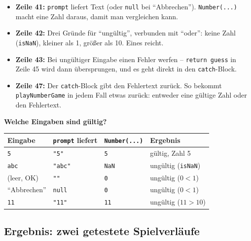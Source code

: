 \documentclass[a4paper,11pt]{article}
\begin{document}
\begin{itemize}
\item \textbf{Zeile 41:} \texttt{prompt} liefert Text (oder \texttt{null} bei "`Abbrechen"'). \texttt{Number(...)}
      macht eine Zahl daraus, damit man vergleichen kann.
\item \textbf{Zeile 42:} Drei Gründe für "`ungültig"', verbunden mit "`oder"': keine Zahl (\texttt{isNaN}),
      kleiner als 1, größer als 10. Eines reicht.
\item \textbf{Zeile 43:} Bei ungültiger Eingabe einen Fehler werfen -- \texttt{return guess} in Zeile 45 wird
      dann übersprungen, und es geht direkt in den \texttt{catch}-Block.
\item \textbf{Zeile 47:} Der \texttt{catch}-Block gibt den Fehlertext zurück. So bekommt \texttt{playNumberGame}
      in jedem Fall etwas zurück: entweder eine gültige Zahl oder den Fehlertext.
\end{itemize}

\textbf{Welche Eingaben sind gültig?}
\begin{center}
\begin{tabular}{@{}llll@{}}
\toprule
Eingabe & \texttt{prompt} liefert & \texttt{Number(...)} & Ergebnis\\
\midrule
\texttt{5}          & \lstinline|"5"|   & \lstinline|5|   & gültig, Zahl 5\\
\texttt{abc}        & \lstinline|"abc"| & \lstinline|NaN| & ungültig (\texttt{isNaN})\\
(leer, OK)          & \lstinline|""|    & \lstinline|0|   & ungültig ($0 < 1$)\\
"`Abbrechen"'       & \lstinline|null|  & \lstinline|0|   & ungültig ($0 < 1$)\\
\texttt{11}         & \lstinline|"11"|  & \lstinline|11|  & ungültig ($11 > 10$)\\
\bottomrule
\end{tabular}
\end{center}

\subsection{Ergebnis: zwei getestete Spielverläufe}
\end{document}
